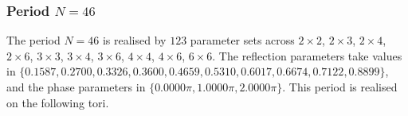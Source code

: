 \par
\subsubsection{Period $N = 46$}
The period $N=46$ is realised by $123$ parameter sets across $2\times2$, $2\times3$, $2\times4$, $2\times6$, $3\times3$, $3\times4$, $3\times6$, $4\times4$, $4\times6$, $6\times6$. The reflection parameters take values in $\{0.1587, 0.2700, 0.3326, 0.3600, 0.4659, 0.5310, 0.6017, 0.6674, 0.7122, 0.8899\}$, and the phase parameters in $\{0.0000\pi, 1.0000\pi, 2.0000\pi\}$. This period is realised on the following tori.
